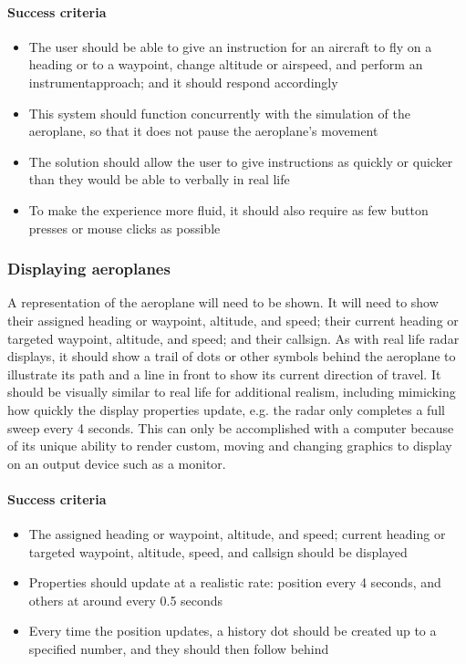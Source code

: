 \documentclass{article}
\begin{document}
\paragraph{Success criteria}
\begin{itemize}
    \item The user should be able to give an instruction for an aircraft to fly on a \gls{heading} or to a \gls{waypoint}, change altitude or \gls{airspeed}, and perform an \gls{instrumentapproach}; and it should respond accordingly
    \item This system should function concurrently with the simulation of the aeroplane, so that it does not pause the aeroplane's movement
    \item The solution should allow the user to give instructions as quickly or quicker than they would be able to verbally in real life
    \item To make the experience more fluid, it should also require as few button presses or mouse clicks as possible
\end{itemize}

\subsubsection{Displaying aeroplanes}
A representation of the aeroplane will need to be shown.
It will need to show their assigned heading or waypoint, altitude, and speed; their current heading or targeted waypoint, altitude, and speed; and their callsign.
As with real life radar displays, it should show a trail of dots or other symbols behind the aeroplane to illustrate its path and a line in front to show its current direction of travel.
It should be visually similar to real life for additional realism, including mimicking how quickly the display properties update, e.g. the radar only completes a full sweep every 4 seconds.
This can only be accomplished with a computer because of its unique ability to render custom, moving and changing graphics to display on an output device such as a monitor.

\paragraph{Success criteria}
\begin{itemize}
    \item The assigned heading or waypoint, altitude, and speed; current heading or targeted waypoint, altitude, speed, and callsign should be displayed
    \item Properties should update at a realistic rate: position every 4 seconds, and others at around every 0.5 seconds
    \item Every time the position updates, a history dot should be created up to a specified number, and they should then follow behind
\end{itemize}
\end{document}
